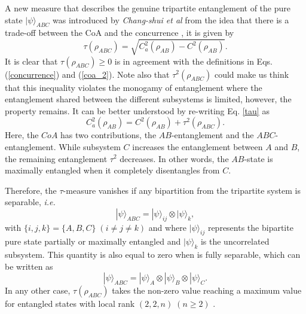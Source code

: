 A new measure that describes the genuine tripartite entanglement of the pure state $|\psi\rangle_{ABC}$ was introduced by \textit{Chang-shui et al} from the idea that there is a trade-off between the CoA and the concurrence \cite{yu2008entanglement}, it is given by
\begin{equation}\label{tau}
\tau\left(\rho_{ABC}\right)=\sqrt{C_{a}^{2}\left(\rho_{AB}\right)-C^{2}\left(\rho_{AB}\right)}.
\end{equation}
It is clear that $\tau\left(\rho_{ABC}\right)\geq 0$ is in agreement with the definitions in Eqs. (\ref{concurrence}) and (\ref{coa_2}). Note also that $\tau^{2}\left(\rho_{ABC}\right)$ could make us think that this inequality violates the monogamy of entanglement \cite{coffman2000distributed} where the entanglement shared between the different subsystems is limited, however, the property remains. It can be better understood by re-writing Eq. \eqref{tau} as
\begin{equation}\label{coa_3}
C_{a}^{2}\left(\rho_{AB}\right)=C^{2}\left(\rho_{AB}\right)+\tau^{2}\left(\rho_{ABC}\right).
\end{equation}
Here, the $CoA$ has two contributions, the $AB$-entanglement and the $ABC$-entanglement. While subsystem $C$ increases the entanglement between $A$ and $B$, the remaining entanglement $\tau^{2}$ decreases. In other words, the $AB$-state is maximally entangled when it completely disentangles from $C$.

Therefore, the $\tau$-measure vanishes if any bipartition from the tripartite system is separable, \textit{i.e.}
\begin{equation}
|\psi\rangle_{ABC}=|\psi\rangle_{ij}\otimes |\psi\rangle_{k},
\end{equation}
with $\{i, j, k\}=\{A, B, C\} \;\left(i\neq j\neq k\right)$ and where $|\psi\rangle_{ij}$ represents the bipartite pure state partially or maximally entangled and $|\psi\rangle_{k}$ is the uncorrelated subsystem. This quantity is also equal to zero when is fully separable, which can be written as
\begin{equation}
|\psi\rangle_{ABC}=|\psi\rangle_{A}\otimes |\psi\rangle_{B} \otimes |\psi\rangle_{C}.
\end{equation}
In any other case, $\tau\left(\rho_{ABC}\right)$ takes the non-zero value reaching a maximum value for entangled states with local rank $(2, 2, n)\; (n\geq 2)$ \cite{miyake2004multipartite}.

